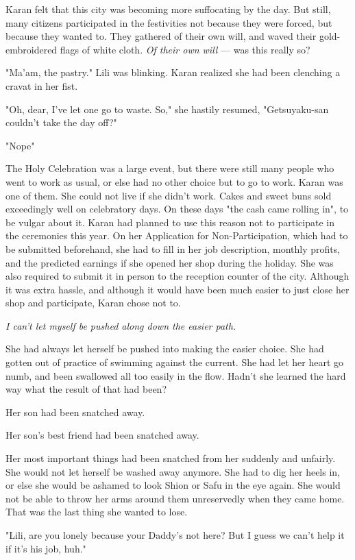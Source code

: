 Karan felt that this city was becoming more suffocating by the day. But
still, many citizens participated in the festivities not because they
were forced, but because they wanted to. They gathered of their own
will, and waved their gold-embroidered flags of white cloth. \emph{Of their
own will} --- was this really so?

"Ma'am, the pastry." Lili was blinking. Karan realized she had been
clenching a cravat in her fist.

"Oh, dear, I've let one go to waste. So," she hastily resumed,
"Getsuyaku-san couldn't take the day off?"

"Nope\el "

The Holy Celebration was a large event, but there were still many people
who went to work as usual, or else had no other choice but to go to
work. Karan was one of them. She could not live if she didn't work.
Cakes and sweet buns sold exceedingly well on celebratory days. On these
days "the cash came rolling in", to be vulgar about it. Karan had
planned to use this reason not to participate in the ceremonies this
year. On her Application for Non-Participation, which had to be
submitted beforehand, she had to fill in her job description, monthly
profits, and the predicted earnings if she opened her shop during the
holiday. She was also required to submit it in person to the reception
counter of the city. Although it was extra hassle, and although it would
have been much easier to just close her shop and participate, Karan
chose not to.

\emph{I can't let myself be pushed along down the easier path.}

She had always let herself be pushed into making the easier choice. She
had gotten out of practice of swimming against the current. She had let
her heart go numb, and been swallowed all too easily in the flow. Hadn't
she learned the hard way what the result of that had been?

Her son had been snatched away.

Her son's best friend had been snatched away.

Her most important things had been snatched from her suddenly and
unfairly. She would not let herself be washed away anymore. She had to
dig her heels in, or else she would be ashamed to look Shion or Safu in
the eye again. She would not be able to throw her arms around them
unreservedly when they came home. That was the last thing she wanted to
lose.

"Lili, are you lonely because your Daddy's not here? But I guess we
can't help it if it's his job, huh."

